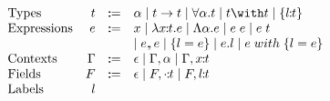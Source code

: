 \[ \begin{array}{lrrl}
  \text{Types} & t & \dcoloneq &
    \alpha
    \mid t \to t
    \mid \univquant{\alpha}{t}
    \mid t \with t
    \mid \recordtype{l}{t} \\

  \text{Expressions} & e & \dcoloneq &
    x
    \mid \abs{\rel{x}{t}}{e}
    \mid \Abs{\alpha}{e}
    \mid \app{e}{e}
    \mid \app{e}{t} \\ & & &
    \mid e \dcomma e
    \mid \recordintro{l}{e}
    \mid e.l
    \mid \recordupdate{e}{l}{e} \\

  \text{Contexts} & \Gamma & \dcoloneq &
    \epsilon
    \mid \Gamma, \alpha
    \mid \Gamma, \rel{x}{t} \\

  \text{Fields} & F & \dcoloneq &
    \epsilon
    \mid F, \rel{\cdot}{t}
    \mid F, \rel{l}{t} \\

  \text{Labels} & l &
\end{array} \]
